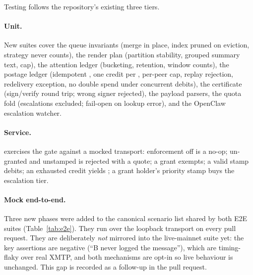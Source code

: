 Testing follows the repository's existing three tiers.

\paragraph{Unit.} New suites cover the queue invariants (merge in place, index pruned on
eviction,  strategy never counts), the render plan (partition stability,
grouped summary text, cap), the attention ledger (bucketing, retention, window counts),
the postage ledger (idempotent , one credit per , per-peer
cap, replay rejection, redelivery exception, no double spend under concurrent debits), the
certificate (sign/verify round trip; wrong signer rejected), the payload parsers, the
quota fold (escalations excluded; fail-open on lookup error), and the OpenClaw escalation
watcher.

\paragraph{Service.}  exercises the gate against a mocked transport:
enforcement off is a no-op; un-granted and unstamped is rejected with a quote; a grant
exempts; a valid stamp debits; an exhausted credit yields ; a
grant holder's priority stamp buys the escalation tier.

\paragraph{Mock end-to-end.} Three new phases were added to the canonical scenario list
shared by both E2E suites (Table~\ref{tab:e2e}). They run over the loopback transport on
every pull request. They are deliberately \emph{not} mirrored into the live-mainnet suite
yet: the key assertions are negative (``B never logged the message''), which are
timing-flaky over real XMTP, and both mechanisms are opt-in so live behaviour is
unchanged. This gap is recorded as a follow-up in the pull request.

